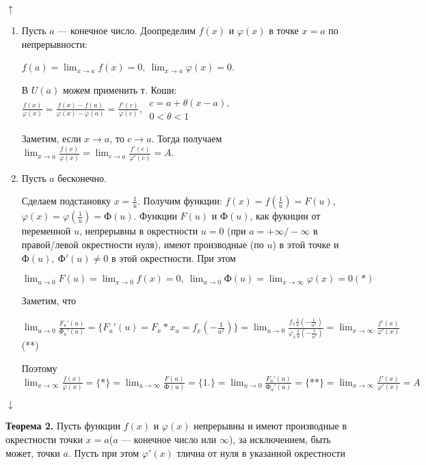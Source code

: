 \documentclass{article}
\begin{document}
    \(\uparrow\)
    \begin{enumerate}
        \item Пусть \(a\) --- конечное число. Доопределим \(f(x)\) и \(\varphi(x)\) в точке \(x=a\) по непрерывности:

        \(f(a) = \lim_{x \to a} f(x) = 0,\ \lim_{x \to a} \varphi(x) = 0\).

        В \(U(a)\) можем применить т. Коши: \(\frac{f(x)}{\varphi(x)} = \frac{f(x) - f(a)}{\varphi(x) - \varphi(a)} = \frac{f'(c)}{\varphi(c)},\ \begin{array}{l} c = a + \theta(x-a),\\ 0 < \theta < 1\end{array}\)

        Заметим, если \(x \to a\), то \(c \to a\). Тогда получаем \(\lim_{x \to a} \frac{f(x)}{\varphi(x)} = \lim_{c \to a} \frac{f'(c)}{\varphi'(c)} = A\).
        
        \item Пусть $a$ бесконечно.
        
        Сделаем подстановку \( x = \frac{1}{u} \). Получим функции: \( f(x) = f(\frac{1}{u}) = F(u) \), \( \varphi(x) = \varphi(\frac{1}{u}) = \textrm{Ф}(u) \). Функции \( F(u) \) и \( \textrm{Ф}(u) \), как фукнции от переменной $u$, непрерывны в окрестности $u = 0$ (при $a = +\infty/-\infty$ в правой/левой окрестности нуля), имеют производные (по $u$) в этой точке и \( \textrm{Ф}(u),\ \textrm{Ф}'(u) \neq 0 \) в этой окрестности. При этом

        \( \lim_{u \to 0}F(u) = \lim_{x \to 0}f(x) = 0,\ \lim_{u \to 0}\textrm{Ф}(u) = \lim_{x \to \infty}\varphi(x) = 0 (*) \) 
        
        Заметим, что 

        \(\lim_{u \to 0} \frac{F_u'(u)}{\Phi_u'(u)} = \{F_u'(u) = F_x*x_u = f_x(-\frac{1}{u^2})\} = \lim_{u \to 0} \frac{f_x\frac{1}{u}(-\frac{1}{u^2})}{\varphi_x\frac{1}{u}(-\frac{1}{u^2})} = \lim_{x \to \infty} \frac{f'(x)}{\varphi'(x)}\)(**)
    
        Поэтому \( \lim_{x \to \infty}\frac{f(x)}{\varphi(x)} = \{*\} = \lim_{u \to \infty}\frac{F(u)}{\textrm{Ф}(u)} = \{1.\} = \lim_{u \to 0}\frac{F_u'(u)}{\textrm{Ф}_u'(u)} = \{**\} = \lim_{x \to \infty}\frac{f'(x)}{\varphi'(x)} = A \)
    \end{enumerate}
    \(\downarrow\)

    \textbf{Теорема 2.} Пусть функции \(f(x)\) и \(\varphi(x)\) непрерывны и имеют производные в окрестности точки \(x=a\)(\(a\) --- конечное число или \(\infty\)), за исключением, быть может, точки \(a\). Пусть при этом \(\varphi'(x)\) тлична от нуля в указанной окрестности
\end{document}
